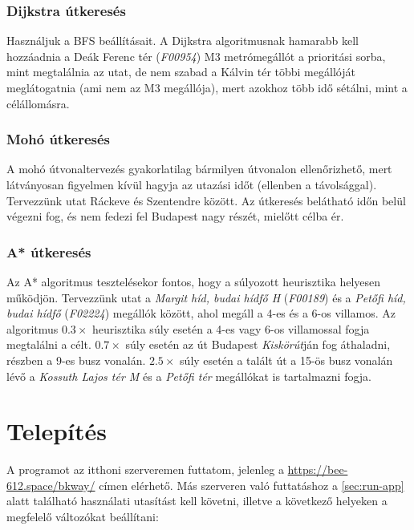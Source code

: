 \subsubsection{Dijkstra útkeresés}

Használjuk a BFS beállításait. A Dijkstra algoritmusnak hamarabb kell hozzáadnia a Deák Ferenc tér (\textit{F00954}) M3 metrómegállót a prioritási sorba, mint megtalálnia az utat, de nem szabad a Kálvin tér többi megállóját meglátogatnia (ami nem az M3 megállója), mert azokhoz több idő sétálni, mint a célállomásra.

\subsubsection{Mohó útkeresés}

A mohó útvonaltervezés gyakorlatilag bármilyen útvonalon ellenőrizhető, mert látványosan figyelmen kívül hagyja az utazási időt (ellenben a távolsággal). Tervezzünk utat Ráckeve és Szentendre között. Az útkeresés belátható időn belül végezni fog, és nem fedezi fel Budapest nagy részét, mielőtt célba ér.

\subsubsection{A* útkeresés}

Az A* algoritmus tesztelésekor fontos, hogy a súlyozott heurisztika helyesen működjön. Tervezzünk utat a \textit{Margit híd, budai hídfő H} (\textit{F00189}) és a \textit{Petőfi híd, budai hídfő} (\textit{F02224}) megállók között, ahol megáll a 4-es és a 6-os villamos. Az algoritmus $0.3\times$ heurisztika súly esetén a 4-es vagy 6-os villamossal fogja megtalálni a célt. $0.7\times$ súly esetén az út Budapest \textit{Kiskörút}ján fog áthaladni, részben a 9-es busz vonalán. $2.5\times$ súly esetén a talált út a 15-ös busz vonalán lévő a \textit{Kossuth Lajos tér M} és a \textit{Petőfi tér} megállókat is tartalmazni fogja.

\section{Telepítés}

A programot az itthoni szerveremen futtatom, jelenleg a \mbox{\url{https://bee-612.space/bkway/}} címen elérhető. Más szerveren való futtatáshoz a \ref{sec:run-app} alatt található használati utasítást kell követni, illetve a következő helyeken a megfelelő változókat beállítani:

